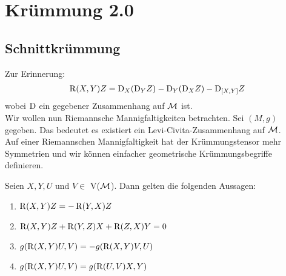 \chapter{Krümmung 2.0}
\section{Schnittkrümmung}
Zur Erinnerung:
\begin{align}
	\operatorname{R}(X,Y)Z = \mathrm{D}_X(\mathrm{D}_YZ)-\mathrm{D}_Y(\mathrm{D}_XZ)-\mathrm{D}_{[X,Y]}Z
\end{align}
wobei $\mathrm{D}$ ein gegebener Zusammenhang auf $\mathcal{M}$ ist. \\
Wir wollen nun Riemannsche Mannigfaltigkeiten betrachten. Sei $(M,g)$ gegeben. Das bedeutet es existiert ein Levi-Civita-Zusammenhang auf $\mathcal{M}$. \\
Auf einer Riemannschen Mannigfaltigkeit hat der Krümmungstensor mehr Symmetrien und wir können einfacher geometrische Krümmungsbegriffe definieren.
\begin{satz}
Seien $X, Y, U$ und $V \in $ V($\mathcal{M}$).
Dann gelten die folgenden Aussagen:	
\begin{enumerate}
	\item $\operatorname{R}(X,Y)Z = -\operatorname{R}(Y,X)Z$
	\item $\operatorname{R}(X,Y)Z +\operatorname{R}(Y,Z)X+\operatorname{R}(Z,X)Y = 0$
	\item $g(\operatorname{R}(X,Y)U,V)=-g(\operatorname{R}(X,Y)V,U)$
	\item $g(\operatorname{R}(X,Y)U,V)=g(\operatorname{R}(U,V)X,Y)$
\end{enumerate}
\end{satz}
